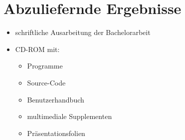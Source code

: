 \section{Abzuliefernde Ergebnisse}
\begin{itemize}
	\item schriftliche Ausarbeitung der Bachelorarbeit
	\item CD-ROM mit:
	\begin{itemize}
		\item Programme
		\item Source-Code
		\item Benutzerhandbuch
		\item multimediale Supplementen
		\item Präsentationsfolien
	\end{itemize}
\end{itemize}